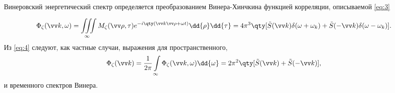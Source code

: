 Винеровский энергетический спектр определяется преобразованием Винера-Хинчкина функцией корреляции, описываемой \eqref{eq:3}

\begin{gather}
	\label{eq:4}
	\Phi_{\zeta}(\vec k ,\omega)= \iiint\limits_{\infty} 
	M_{\zeta}(\vec \rho, \tau) e^{-i\qty(\vec k \vec \rho + \omega t)} \dd{\rho} \dd{\tau}=4\pi^3 \qty[\tilde S(\vec k) \delta(\omega+\omega_k)+\tilde S(- \vec k) \delta(\omega- \omega_k)].
\end{gather}
Из \eqref{eq:4} следуют, как частные случаи, выражения для пространственного,
\begin{equation}
	\Phi_{\zeta}(\vec k)=\frac{1}{2\pi} \int\limits_{\infty} \Phi_{\zeta}(\vec k, \omega) \dd{\omega}= 2 \pi^2 \qty[\tilde S(\vec k)+\tilde S(-\vec k)],
\end{equation}
и временного спектров Винера.

{\color{red}{Разобрать фундаментально всю  теорию до этого момента.}}
